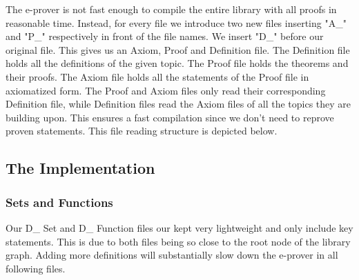 \documentclass[11pt]{article}
\begin{document}
\newpage

The e-prover is not fast enough to compile the entire library with all proofs in reasonable time. 
Instead, for every file we introduce two new files inserting "A\_" and "P\_" respectively in front of the file names. We insert "D\_" before our original file. This gives us an Axiom, Proof and Definition file. 
The Definition file holds all the definitions of the given topic. 
The Proof file holds the theorems and their proofs. The Axiom file holds all the statements of the Proof file in axiomatized form. 
The Proof and Axiom files only read their corresponding Definition file, while Definition files read the Axiom files of all the topics they are building upon. 
This ensures a fast compilation since we don't need to reprove proven statements. 
This file reading structure is depicted below.

\begin{figure}[h]
\begin{center}
\end{center}
\end{figure}

\subsection{The Implementation}

\subsubsection{Sets and Functions}

Our D\_ Set and D\_ Function files our kept very lightweight and only include key statements. This is due to both files being so close to the root node of the library graph. Adding more definitions will substantially slow down the e-prover in all following files.
\end{document}
